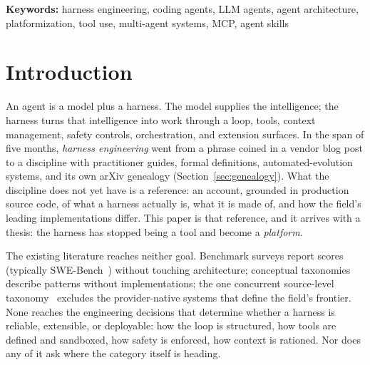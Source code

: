 \documentclass[11pt,a4paper]{article}
\begin{document}
\begin{abstract}
These threads converge on the paper's thesis: in the first half of 2026 the coding harness completed a turn from tool to \emph{platform}.
Harnesses became importable SDKs while framework vendors shipped harnesses; marketplaces, switching-cost tooling, and enterprise governance layers appeared; the agent became addressable as a model behind an OpenAI-compatible endpoint; and a meta-harness now orchestrates eleven vendor harnesses (half this corpus among them) behind one API, re-implementing the expensive parts and arbitraging the proprietary ones.
The paper closes with 18 design recommendations pinned to the observed code, and a 90-line minimum-viable-harness scaffold that implements ten of them.
\end{abstract}

\vspace{0.3em}
\noindent\textbf{Keywords:} harness engineering, coding agents, LLM agents, agent architecture, platformization, tool use, multi-agent systems, MCP, agent skills

\section{Introduction}
\label{sec:intro}

An agent is a model plus a harness.
The model supplies the intelligence; the harness turns that intelligence into work through a loop, tools, context management, safety controls, orchestration, and extension surfaces.
In the span of five months, \emph{harness engineering} went from a phrase coined in a vendor blog post to a discipline with practitioner guides, formal definitions, automated-evolution systems, and its own arXiv genealogy (Section~\ref{sec:genealogy}).
What the discipline does not yet have is a reference: an account, grounded in production source code, of what a harness actually is, what it is made of, and how the field's leading implementations differ.
This paper is that reference, and it arrives with a thesis: the harness has stopped being a tool and become a \emph{platform}.

The existing literature reaches neither goal.
Benchmark surveys report scores (typically SWE-Bench~\cite{jimenez2024swebench}) without touching architecture; conceptual taxonomies~\cite{weng2023llmagents,wang2024survey} describe patterns without implementations; the one concurrent source-level taxonomy~\cite{rombaut2026} excludes the provider-native systems that define the field's frontier.
None reaches the engineering decisions that determine whether a harness is reliable, extensible, or deployable: how the loop is structured, how tools are defined and sandboxed, how safety is enforced, how context is rationed.
Nor does any of it ask where the category itself is heading.
\end{document}
